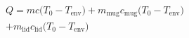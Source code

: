 \begin{multline}
    Q = m c \bigl( T_0 - T_{\mathrm{env}} \bigr)
        + m_{\mathrm{mug}} c_{\mathrm{mug}} \bigl( T_0 - T_{\mathrm{env}} \bigr) \\
        + m_{\mathrm{lid}} c_{\mathrm{lid}} \bigl( T_0 - T_{\mathrm{env}} \bigr)
\end{multline}
